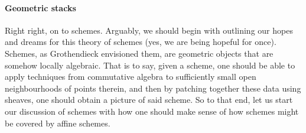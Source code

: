                 \paragraph{Geometric stacks}
                    Right right, on to schemes. Arguably, we should begin with outlining our hopes and dreams for this theory of schemes (yes, we are being hopeful for once). Schemes, as Grothendieck envisioned them, are geometric objects that are somehow locally algebraic. That is to say, given a scheme, one should be able to apply techniques from commutative algebra to sufficiently small open neighbourhoods of points therein, and then by patching together these data using sheaves, one should obtain a picture of said scheme. So to that end, let us start our discussion of schemes with how one should make sense of how schemes might be covered by affine schemes. 
                

